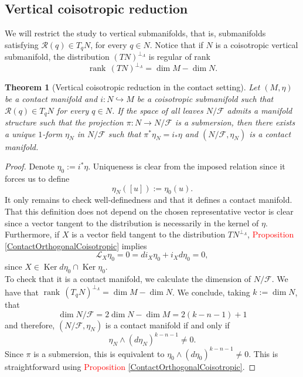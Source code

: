 \documentclass[12pt]{article}
\newtheorem{theorem}{Theorem}[section]
\renewcommand{\dim}{\operatorname{dim}}
\renewcommand{\ker}{\operatorname{Ker}}
\begin{document}
\subsection{Vertical coisotropic reduction}
We will restrict the study to vertical submanifolds, that is, submanifolds satisfying $\mathcal{R}(q) \in T_qN$, for every $q \in N$. Notice that if $N$ is a coisotropic vertical submanifold, the distribution $(TN)^{\perp_\Lambda}$ is regular of rank $$\operatorname{rank} \, (TN)^{\perp_\Lambda} = \dim M - \dim N.$$
\begin{theorem}[Vertical coisotropic reduction in the contact setting] \label{VerticalReductionContact} Let $(M, \eta)$ be a contact manifold and $i :N \hookrightarrow M$ be a coisotropic submanifold such that $\mathcal{R}(q) \in T_qN$ for every $q \in N$. If the space of all leaves $N /\mathcal{F}$ admits a manifold structure such that the projection $\pi: N \rightarrow N/\mathcal{F}$ is a submersion, then there exists a unique $1$-form $\eta_N$ in $N/\mathcal{F}$ such that $\pi^*\eta_N = i_*\eta $ and $(N/\mathcal{F},\eta_N)$ is a contact manifold.
\end{theorem}
\begin{proof}
Denote $\eta_0:= i^*\eta$. Uniqueness is clear from the imposed relation since it forces us to define $$\eta_N([u]):= \eta_0(u).$$ It only remains to check well-definedness and that it defines a contact manifold. That this definition does not depend on the chosen representative vector is clear since a vector tangent to the distribution is necessarily in the kernel of $\eta$. Furthermore, if $X$ is a vector field tangent to the distribution $TN^{\perp_\Lambda}$, \textcolor{red}{Proposition \ref{ContactOrthogonalCoisotropic}} implies $$\mathcal{L}_X \eta_0 = 0 = di_X \eta_0 + i_Xd\eta_0 = 0,$$ since $X \in \ker d\eta_0 \cap \ker \eta_0$. \\

  To check that it is a contact manifold, we calculate the dimension of $N /\mathcal{F}$. We have that $\operatorname{rank} \, (T_qN)^{\perp_\Lambda} = \dim M - \dim N$. We conclude, taking $k:= \dim N$, that $$\dim N/\mathcal{F} = 2 \dim N - \dim M = 2(k-n-1) + 1$$ and therefore, $(N/\mathcal{F}, \eta_N)$ is a contact manifold if and only if $$\eta_N \wedge ( d\eta_N)^{k-n-1}\neq 0.$$ Since $\pi$ is a submersion, this is equivalent to $\eta_0 \wedge ( d\eta_0)^{k-n-1}\neq0$. This is straightforward using \textcolor{red}{Proposition \ref{ContactOrthogonalCoisotropic}}.
\end{proof}
\end{document}
